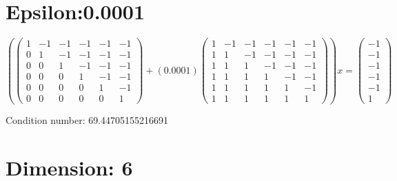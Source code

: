 \documentclass{article}%
\begin{document}
\section{Epsilon:0.0001}%
\label{sec:Epsilon0.0001}%
\[%
( \begin{pmatrix}%
1&-1&-1&-1&-1&-1\\%
0&1&-1&-1&-1&-1\\%
0&0&1&-1&-1&-1\\%
0&0&0&1&-1&-1\\%
0&0&0&0&1&-1\\%
0&0&0&0&0&1%
\end{pmatrix} + ( 0.0001 ) \begin{pmatrix}%
1&-1&-1&-1&-1&-1\\%
1&1&-1&-1&-1&-1\\%
1&1&1&-1&-1&-1\\%
1&1&1&1&-1&-1\\%
1&1&1&1&1&-1\\%
1&1&1&1&1&1%
\end{pmatrix} )x = \begin{pmatrix}%
-1\\%
-1\\%
-1\\%
-1\\%
-1\\%
1%
\end{pmatrix}%
\]%
\begin{Large}%
Condition number:%
69.44705155216691%
\end{Large}

%
\section{Dimension: 6}%
\label{sec:Dimension6}%
\end{document}
